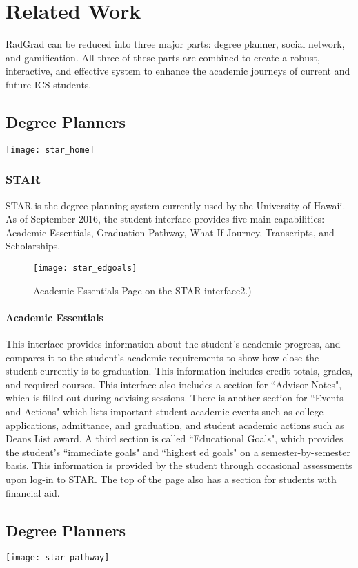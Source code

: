 \chapter{Related Work}
RadGrad can be reduced into three major parts: degree planner, social network, and gamification. All three of these parts are combined to create a robust, interactive, and effective system to enhance the academic journeys of current and future ICS students. 
\section{Degree Planners}
\texttt{[image: star\_home]}
\subsection{STAR}
STAR is the degree planning system currently used by the University of Hawaii. As of September 2016, the student interface provides five main capabilities: Academic Essentials, Graduation Pathway, What If Journey, Transcripts, and Scholarships. 
\begin{figure}[h]
\centering
\texttt{[image: star\_edgoals]}
\caption{Academic Essentials Page on the STAR interface2.)}
\end{figure}
\subsubsection{Academic Essentials}
This interface provides information about the student's academic progress, and compares it to the student's academic requirements to show how close the student currently is to graduation. This information includes credit totals, grades, and required courses. This interface also includes a section for ``Advisor Notes", which is filled out during advising sessions. There is another section for ``Events and Actions" which lists important student academic events such as college applications, admittance, and graduation, and student academic actions such as Deans List award. A third section is called ``Educational Goals", which provides the student's ``immediate goals" and ``highest ed goals" on a semester-by-semester basis. This information is provided by the student through occasional assessments upon log-in to STAR. The top of the page also has a section for students with financial aid.
\section{Degree Planners}
\texttt{[image: star\_pathway]}
